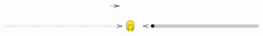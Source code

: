 \[\begin{tikzpicture}[x=0.75pt,y=0.75pt,yscale=-1,xscale=1]
\draw    (287.11,125.17) -- (304.11,125.17) ;
\draw [shift={(306.11,125.17)}, rotate = 180] [color={rgb, 255:red, 0; green, 0; blue, 0 }  ][line width=0.75]    (10.93,-3.29) .. controls (6.95,-1.4) and (3.31,-0.3) .. (0,0) .. controls (3.31,0.3) and (6.95,1.4) .. (10.93,3.29)   ;
\draw  [dash pattern={on 0.84pt off 2.51pt}]  (70.11,165.5) -- (304.11,165.5)(70.11,168.5) -- (304.11,168.5) ;
\draw [shift={(312.11,167)}, rotate = 180] [color={rgb, 255:red, 0; green, 0; blue, 0 }  ][line width=0.75]    (10.93,-3.29) .. controls (6.95,-1.4) and (3.31,-0.3) .. (0,0) .. controls (3.31,0.3) and (6.95,1.4) .. (10.93,3.29)   ;
\draw  [dash pattern={on 0.84pt off 2.51pt}]  (591,168.5) -- (362.11,168.5)(591,165.5) -- (362.11,165.5) ;
\draw [shift={(354.11,167)}, rotate = 360] [color={rgb, 255:red, 0; green, 0; blue, 0 }  ][line width=0.75]    (10.93,-3.29) .. controls (6.95,-1.4) and (3.31,-0.3) .. (0,0) .. controls (3.31,0.3) and (6.95,1.4) .. (10.93,3.29)   ;
\draw  [fill={rgb, 255:red, 248; green, 231; blue, 28 }  ,fill opacity=1 ] (321,173.97) -- (321,161.51) .. controls (321,158.38) and (324.39,155.84) .. (328.56,155.84) .. controls (332.73,155.84) and (336.11,158.38) .. (336.11,161.51) -- (336.11,173.97) -- (321,173.97) -- cycle (324.02,178.51) -- (324.02,167.17) .. controls (324.02,165.3) and (326.05,163.77) .. (328.56,163.77) .. controls (331.06,163.77) and (333.09,165.3) .. (333.09,167.17) -- (333.09,178.51) ;
\draw [color={rgb, 255:red, 155; green, 155; blue, 155 }  ,draw opacity=0.5 ][line width=3]    (591,168.5) -- (374,168.5)(591,165.5) -- (374,165.5) ;
\draw  [color={rgb, 255:red, 0; green, 0; blue, 0 }  ,draw opacity=1 ][line width=5.25] [line join = round][line cap = round] (374.22,166.67) .. controls (374.22,166.67) and (374.22,166.67) .. (374.22,166.67) ;


\end{tikzpicture}\]
